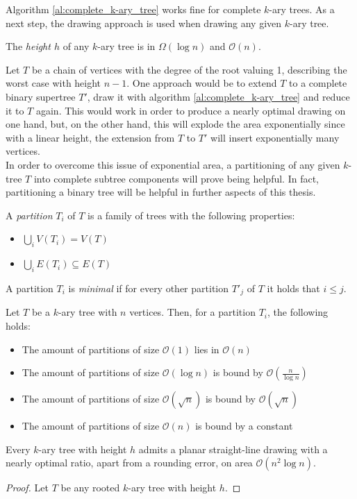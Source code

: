 Algorithm \ref{al:complete_k-ary_tree} works fine for complete $k$-ary trees. As a next step, the drawing approach is used when drawing any given $k$-ary tree. 
\begin{lemma}
	The \emph{height $h$} of any $k$-ary tree is in $\Omega(\log n)$ and $\mathcal{O}(n)$.
\end{lemma}
Let $T$ be a chain of vertices with the degree of the root valuing 1, describing the worst case with height $n-1$. One approach would be to extend $T$ to a complete binary supertree $T'$, draw it with algorithm \ref{al:complete_k-ary_tree} and reduce it to $T$ again. This would work in order to produce a nearly optimal drawing on one hand, but, on the other hand, this will explode the area exponentially since with a linear height, the extension from $T$ to $T'$ will insert exponentially many vertices.\\
In order to overcome this issue of exponential area, a partitioning of any given $k$-tree $T$ into complete subtree components will prove being helpful. In fact, partitioning a binary tree will be helpful in further aspects of this thesis.
\begin{definition}
	A \emph{partition} $T_i$ of $T$ is a family of trees with the following properties:
	\begin{itemize}
		\item $\bigcup_{i} V(T_i) = V(T)$
		\item $\bigcup_{i} E(T_i) \subseteq E(T)$
	\end{itemize}
	A partition $T_i$ is \emph{minimal} if for every other partition $T'_j$ of $T$ it holds that $i\leq j$.
\end{definition}
Let $T$ be a $k$-ary tree with $n$ vertices. Then, for a partition $T_i$, the following holds:
\begin{itemize}
	\item The amount of partitions of size $\mathcal{O}(1)$ lies in $\mathcal{O}(n)$
	\item The amount of partitions of size $\mathcal{O}(\log n)$ is bound by $\mathcal{O}\left(\frac{n}{\log n}\right)$
	\item The amount of partitions of size $\mathcal{O}(\sqrt{n})$ is bound by $\mathcal{O}(\sqrt{n})$
	\item The amount of partitions of size $\mathcal{O}(n)$ is bound by a constant
\end{itemize}
  

\begin{theorem}
	Every $k$-ary tree with height $h$ admits a planar straight-line drawing with a nearly optimal ratio, apart from a rounding error, on area $\mathcal{O}(n^2\log n)$.
\end{theorem}
\begin{proof}
	Let $T$ be any rooted $k$-ary tree with height $h$. 
\end{proof}
